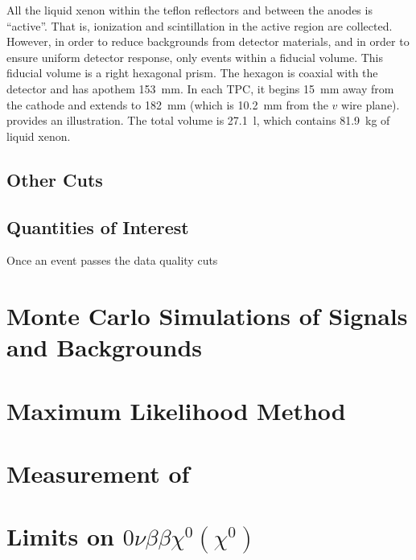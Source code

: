 \documentclass[herrin-thesis.tex]{subfiles}
\begin{document}
All the liquid xenon within the teflon reflectors and between the anodes is ``active''. That is, ionization and scintillation in the active region are collected. However, in order to reduce backgrounds from detector materials, and in order to ensure uniform detector response, only events within a fiducial volume. This fiducial volume is a right hexagonal prism. The hexagon is coaxial with the detector and has apothem \SI{153}{\mm}. In each TPC, it begins \SI{15}{\mm} away from the cathode and extends to \SI{182}{\mm} (which is \SI{10.2}{\mm} from the \(v\) wire plane).  provides an illustration. The total volume is \SI{27.1}{\litre}, which contains \SI{81.9}{\kg} of liquid xenon.

\subsection{Other Cuts}

\subsection{Quantities of Interest}
Once an event passes the data quality cuts

\section{Monte Carlo Simulations of Signals and Backgrounds}

\section{Maximum Likelihood Method}

\section{Measurement of \twonu}

\section{Limits on \(0\nu\beta\beta\chi^0(\chi^0)\)}
\end{document}
